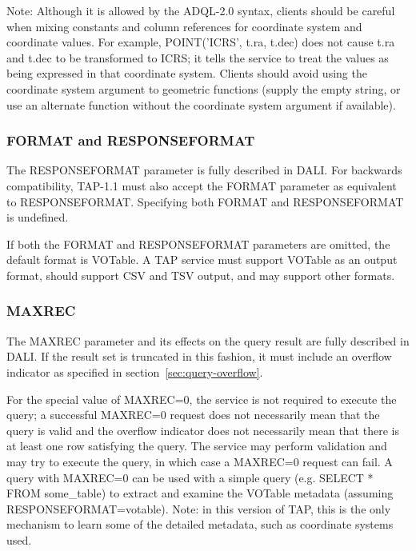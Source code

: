 \documentclass[11pt,letter]{ivoa}
\begin{document}
Note: Although it is allowed by the ADQL-2.0 syntax, clients should be careful when 
mixing constants and column references for coordinate system and coordinate 
values. For example, POINT('ICRS', t.ra, t.dec) does not cause t.ra and t.dec to 
be transformed to ICRS; it tells the service to treat the values  as 
being expressed in that coordinate system. Clients should avoid using the coordinate 
system argument to geometric functions (supply the empty string, or use an 
alternate function without the coordinate system argument if available).

\subsubsection{FORMAT and RESPONSEFORMAT}
\label{sec:RESPONSEFORMAT}

The RESPONSEFORMAT parameter is fully described in DALI. For 
backwards 
compatibility, TAP-1.1 must also accept the FORMAT parameter as equivalent to 
RESPONSEFORMAT.  
Specifying both FORMAT and RESPONSEFORMAT is undefined.

If both the FORMAT and RESPONSEFORMAT parameters are omitted, the
default format is VOTable.  A TAP service must support VOTable as an
output format, should support CSV and TSV output, and may support other
formats.

\subsubsection{MAXREC}
\label{sec:MAXREC}

The MAXREC parameter and its effects on the query result are fully described in 
DALI. If the result set is truncated in this fashion, it must 
include an overflow indicator as specified in section~\ref{sec:query-overflow}.

For the special value of MAXREC=0, the service is not required to execute the 
query; a successful  MAXREC=0 request does not necessarily mean that the query 
is valid and the overflow indicator does not necessarily mean that there is at 
least one row satisfying the query. The service may perform validation and may 
try to execute the query, in which case a MAXREC=0 request can fail. A query 
with MAXREC=0 can be used with a simple query (e.g. SELECT * FROM  
some\_table) to extract and examine the VOTable metadata (assuming 
RESPONSEFORMAT=votable). Note: in this version of TAP, this is the only mechanism to 
learn some of the detailed metadata, such as coordinate systems used.
\end{document}
